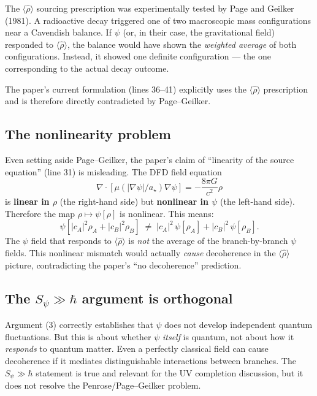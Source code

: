 \documentclass[11pt,a4paper]{article}
\begin{document}
The $\langle\hat\rho\rangle$ sourcing prescription was experimentally
tested by Page and Geilker (1981). A radioactive decay triggered one
of two macroscopic mass configurations near a Cavendish balance. If
$\psi$ (or, in their case, the gravitational field) responded to
$\langle\hat\rho\rangle$, the balance would have shown the
\emph{weighted average} of both configurations. Instead, it showed
one definite configuration --- the one corresponding to the actual
decay outcome.

The paper's current formulation (lines 36--41) explicitly uses the
$\langle\hat\rho\rangle$ prescription and is therefore directly
contradicted by Page--Geilker.

\subsection{The nonlinearity problem}

Even setting aside Page--Geilker, the paper's claim of ``linearity
of the source equation'' (line 31) is misleading. The DFD field
equation
\[
\nabla\cdot[\mu(|\nabla\psi|/a_\star)\nabla\psi] = -\frac{8\pi G}{c^2}\rho
\]
is \textbf{linear in $\rho$} (the right-hand side) but
\textbf{nonlinear in $\psi$} (the left-hand side). Therefore the
map $\rho \mapsto \psi[\rho]$ is nonlinear. This means:
\[
\psi[|c_A|^2\rho_A + |c_B|^2\rho_B]
\;\neq\;
|c_A|^2\,\psi[\rho_A] + |c_B|^2\,\psi[\rho_B].
\]
The $\psi$ field that responds to $\langle\hat\rho\rangle$ is
\emph{not} the average of the branch-by-branch $\psi$ fields.
This nonlinear mismatch would actually \emph{cause} decoherence in
the $\langle\hat\rho\rangle$ picture, contradicting the paper's
``no decoherence'' prediction.

\subsection{The $S_\psi \gg \hbar$ argument is orthogonal}

Argument (3) correctly establishes that $\psi$ does not develop
independent quantum fluctuations. But this is about whether $\psi$
\emph{itself} is quantum, not about how it \emph{responds} to quantum
matter. Even a perfectly classical field can cause decoherence if it
mediates distinguishable interactions between branches. The
$S_\psi \gg \hbar$ statement is true and relevant for the UV completion
discussion, but it does not resolve the Penrose/Page--Geilker problem.

\end{document}
